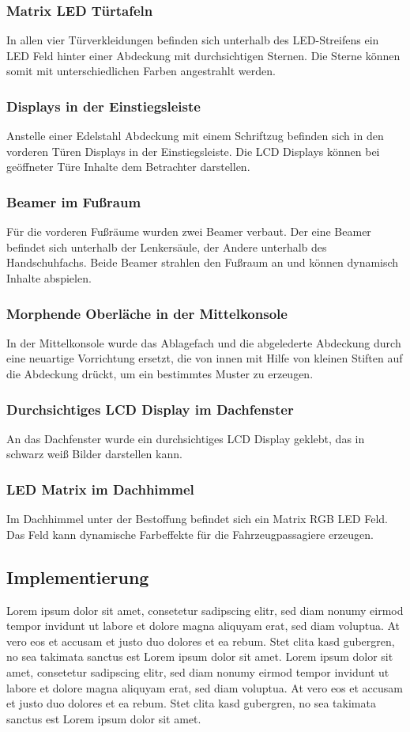 \subsubsection{Matrix LED Türtafeln}
In allen vier Türverkleidungen befinden sich unterhalb des LED-Streifens ein LED Feld hinter einer Abdeckung mit durchsichtigen Sternen. Die Sterne können somit mit unterschiedlichen Farben angestrahlt werden. 
\subsubsection{Displays in der Einstiegsleiste}
Anstelle einer Edelstahl Abdeckung mit einem Schriftzug befinden sich in den vorderen Türen Displays in der Einstiegsleiste. Die LCD Displays können bei geöffneter Türe Inhalte dem Betrachter darstellen.
\subsubsection{Beamer im Fußraum}
Für die vorderen Fußräume wurden zwei Beamer verbaut. Der eine Beamer befindet sich unterhalb der Lenkersäule, der Andere unterhalb des Handschuhfachs. Beide Beamer strahlen den Fußraum an und können dynamisch Inhalte abspielen.
\subsubsection{Morphende Oberläche in der Mittelkonsole}
In der Mittelkonsole wurde das Ablagefach und die abgelederte Abdeckung durch eine neuartige Vorrichtung ersetzt, die von innen mit Hilfe von kleinen Stiften auf die Abdeckung drückt, um ein bestimmtes Muster zu erzeugen.
\subsubsection{Durchsichtiges LCD Display im Dachfenster}
An das Dachfenster wurde ein durchsichtiges LCD Display geklebt, das in schwarz weiß Bilder darstellen kann.
\subsubsection{LED Matrix im Dachhimmel}
Im Dachhimmel unter der Bestoffung befindet sich ein Matrix RGB LED Feld. Das Feld kann dynamische Farbeffekte für die Fahrzeugpassagiere erzeugen.

\subsection{Implementierung}
Lorem ipsum dolor sit amet, consetetur sadipscing elitr, sed diam nonumy eirmod tempor invidunt ut labore et dolore magna aliquyam erat, sed diam voluptua. At vero eos et accusam et justo duo dolores et ea rebum. Stet clita kasd gubergren, no sea takimata sanctus est Lorem ipsum dolor sit amet. Lorem ipsum dolor sit amet, consetetur sadipscing elitr, sed diam nonumy eirmod tempor invidunt ut labore et dolore magna aliquyam erat, sed diam voluptua. At vero eos et accusam et justo duo dolores et ea rebum. Stet clita kasd gubergren, no sea takimata sanctus est Lorem ipsum dolor sit amet.


